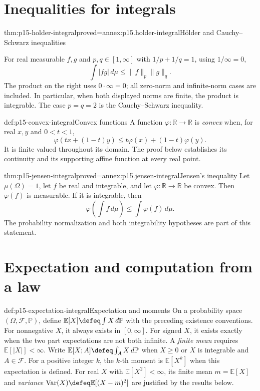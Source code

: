 \section{Inequalities for integrals}
\label{sec:p15-integral-inequalities}

\begin{hbtheorem}{thm:p15-holder-integral}{proved=annex:p15.holder-integral}{H\"older and Cauchy--Schwarz inequalities}
\par\nobreak
For real measurable \(f,g\) and \(p,q\in[1,\infty]\) with
\(1/p+1/q=1\), using \(1/\infty=0\),
\[
 \int|fg|\,d\mu\leq\|f\|_p\|g\|_q.
\]
The product on the right uses \(0\cdot\infty=0\); all zero-norm
and infinite-norm cases are included. In particular, when both displayed
norms are finite, the product is integrable. The case \(p=q=2\) is
the Cauchy--Schwarz inequality.
\end{hbtheorem}

\begin{hbdefinition}{def:p15-convex-integral}{Convex functions}
A function \(\varphi:\mathbb R\to\mathbb R\) is \emph{convex}
when, for real \(x,y\) and \(0<t<1\),
\[
 \varphi(tx+(1-t)y)\leq t\varphi(x)+(1-t)\varphi(y).
\]
It is finite valued throughout its domain. The proof below establishes
its continuity and its supporting affine function at every real point.
\end{hbdefinition}

\begin{hbtheorem}{thm:p15-jensen-integral}{proved=annex:p15.jensen-integral}{Jensen's inequality}
Let \(\mu(\Omega)=1\), let \(f\) be real and integrable, and let
\(\varphi:\mathbb R\to\mathbb R\) be convex. Then \(\varphi(f)\)
is measurable. If it is integrable, then
\[
 \varphi\left(\int f\,d\mu\right)\leq\int\varphi(f)\,d\mu.
\]
The probability normalization and both integrability hypotheses are part
of this statement.
\end{hbtheorem}

\section{Expectation and computation from a law}
\label{sec:p15-general-expectation}

\begin{hbdefinition}{def:p15-expectation-integral}{Expectation and moments}
On a probability space \((\Omega,\mathcal F,\mathbb P)\), define
\(\mathbb E[X]\defeq\int X\,d\mathbb P\) with the preceding
existence conventions. For nonnegative \(X\), it always exists in
\([0,\infty]\). For signed \(X\), it exists exactly when the two
part expectations are not both infinite. A \emph{finite mean} requires
\(\mathbb E[|X|]<\infty\). Write
\(\mathbb E[X;A]\defeq\int_A X\,d\mathbb P\) when \(X\geq0\)
or \(X\) is integrable and \(A\in\mathcal F\).
For a positive integer \(k\), the \(k\)-th moment is
\(\mathbb E[X^k]\) when this expectation is defined.
For real \(X\) with \(\mathbb E[X^2]<\infty\), its finite mean
\(m=\mathbb E[X]\) and \emph{variance}
\(\operatorname{Var}(X)\defeq\mathbb E[(X-m)^2]\) are justified
by the results below.
\end{hbdefinition}

